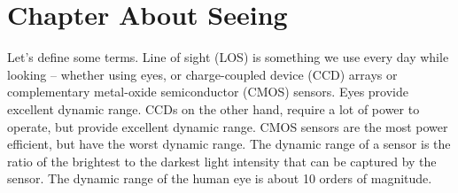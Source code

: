 \section*{Chapter About Seeing}
Let's define some terms. Line of sight (LOS) is something we use every day while looking -- whether using eyes, or charge-coupled device (CCD) arrays or complementary metal-oxide semiconductor (CMOS) sensors. Eyes provide excellent dynamic range. CCDs on the other hand, require a lot of power to operate, but provide excellent dynamic range. CMOS sensors are the most power efficient, but have the worst dynamic range. The dynamic range of a sensor is the ratio of the brightest to the darkest light intensity that can be captured by the sensor. The dynamic range of the human eye is about 10 orders of magnitude.
